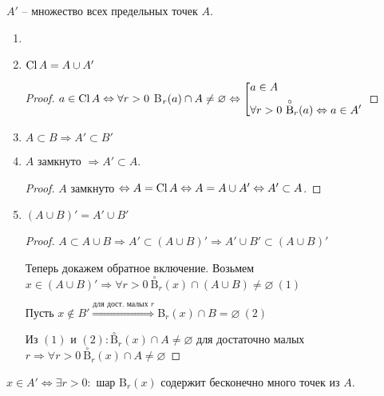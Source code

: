 \begin{designation}
    $A'$ – множество всех предельных точек $A$.
\end{designation}

\begin{statement}
    \begin{enumerate}
        \item[]
        \item $\operatorname{Cl} A= A\cup A'$
        \begin{proof}
            $a\in \operatorname{Cl} A\Leftrightarrow \forall r> 0$ B$_r(a)\cap A\neq\varnothing\Leftrightarrow\left[\begin{gathered}
                a\in A \hfill \\
                \forall r > 0\ \overset{\circ}{\text{B}} _r(a)\Leftrightarrow a\in A' 
            \end{gathered}\right.$
        \end{proof}
        \item $A\subset B\Rightarrow A'\subset B'$
        \item $A$ замкнуто $\Rightarrow A'\subset A$.

        \begin{proof}
            $A$ замкнуто $\Leftrightarrow A=\operatorname{Cl} A\Leftrightarrow A=A\cup A'\Leftrightarrow A'\subset A$.
        \end{proof}
        \item $(A\cup B)'=A'\cup B'$
        \begin{proof}
            $A\subset A\cup B\Rightarrow A'\subset (A\cup B)'\Rightarrow A'\cup B'\subset (A\cup B)'$

            Теперь докажем обратное включение. Возьмем $x\in (A\cup B)'\Rightarrow \forall r>0\ \overset{\circ}{\text{B}}_r(x)\cap (A\cup B)\neq \varnothing\ (1)$ 

            Пусть $x\notin B'\overset{\text{для дост. малых } r}{\Rightarrow}$B$_r(x)\cap B=\varnothing\ (2)$

            Из $(1)$ и $(2):\overset{\circ}{\text{B}}_r(x)\cap A\neq \varnothing$ для достаточно малых $r\Rightarrow\forall r>0\ \overset{\circ}{\text{B}}_r(x)\cap A\neq \varnothing$ 
        \end{proof}
    \end{enumerate}
\end{statement}

\begin{theorem}
    $x\in A'\Leftrightarrow\exists r>0:$ шар B$_r(x)$ содержит бесконечно много точек из $A$.
\end{theorem}

